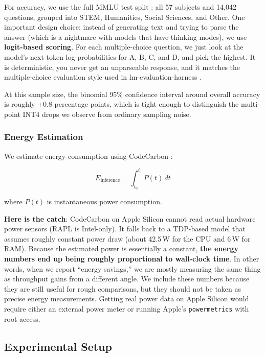 \documentclass[11pt,a4paper]{article}
\begin{document}
For accuracy, we use the full MMLU test split \cite{hendrycks2021mmlu}: all 57 subjects and 14,042 questions, grouped into STEM, Humanities, Social Sciences, and Other. One important design choice: instead of generating text and trying to parse the answer (which is a nightmare with models that have thinking modes), we use \textbf{logit-based scoring}. For each multiple-choice question, we just look at the model's next-token log-probabilities for A, B, C, and D, and pick the highest. It is deterministic, you never get an unparseable response, and it matches the multiple-choice evaluation style used in lm-evaluation-harness \cite{eval-harness}.

At this sample size, the binomial 95\% confidence interval around overall accuracy is roughly $\pm 0.8$ percentage points, which is tight enough to distinguish the multi-point INT4 drops we observe from ordinary sampling noise.

\subsubsection{Energy Estimation}
\label{sec:energy_method}

We estimate energy consumption using CodeCarbon \cite{codecarbon2023}:

\begin{equation}
E_{\text{inference}} = \int_{t_0}^{t_1} P(t) \, dt
\end{equation}

where $P(t)$ is instantaneous power consumption.

\textbf{Here is the catch}: CodeCarbon on Apple Silicon cannot read actual hardware power sensors (RAPL is Intel-only). It falls back to a TDP-based model that assumes roughly constant power draw (about 42.5\,W for the CPU and 6\,W for RAM). Because the estimated power is essentially a constant, \textbf{the energy numbers end up being roughly proportional to wall-clock time}. In other words, when we report ``energy savings,'' we are mostly measuring the same thing as throughput gains from a different angle. We include these numbers because they are still useful for rough comparisons, but they should not be taken as precise energy measurements. Getting real power data on Apple Silicon would require either an external power meter or running Apple's \texttt{powermetrics} with root access.

\subsection{Experimental Setup}
\end{document}
